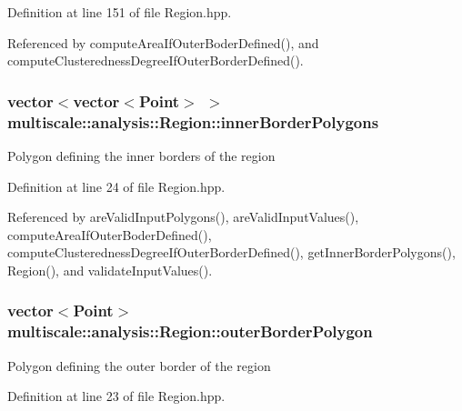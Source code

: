 Definition at line 151 of file Region.\-hpp.



Referenced by compute\-Area\-If\-Outer\-Boder\-Defined(), and compute\-Clusteredness\-Degree\-If\-Outer\-Border\-Defined().

\hypertarget{classmultiscale_1_1analysis_1_1Region_adf9ce65ec31dae1083adbfed3a8f69e1}{
\subsubsection[{inner\-Border\-Polygons}]{\setlength{\rightskip}{0pt plus 5cm}vector$<$vector$<$Point$>$ $>$ multiscale\-::analysis\-::\-Region\-::inner\-Border\-Polygons\hspace{0.3cm}{\ttfamily [private]}}}\label{classmultiscale_1_1analysis_1_1Region_adf9ce65ec31dae1083adbfed3a8f69e1}
Polygon defining the inner borders of the region 

Definition at line 24 of file Region.\-hpp.



Referenced by are\-Valid\-Input\-Polygons(), are\-Valid\-Input\-Values(), compute\-Area\-If\-Outer\-Boder\-Defined(), compute\-Clusteredness\-Degree\-If\-Outer\-Border\-Defined(), get\-Inner\-Border\-Polygons(), Region(), and validate\-Input\-Values().

\hypertarget{classmultiscale_1_1analysis_1_1Region_a5cf5012f0f248cc7135f04c049365fb8}{
\subsubsection[{outer\-Border\-Polygon}]{\setlength{\rightskip}{0pt plus 5cm}vector$<$Point$>$ multiscale\-::analysis\-::\-Region\-::outer\-Border\-Polygon\hspace{0.3cm}{\ttfamily [private]}}}\label{classmultiscale_1_1analysis_1_1Region_a5cf5012f0f248cc7135f04c049365fb8}
Polygon defining the outer border of the region 

Definition at line 23 of file Region.\-hpp.



